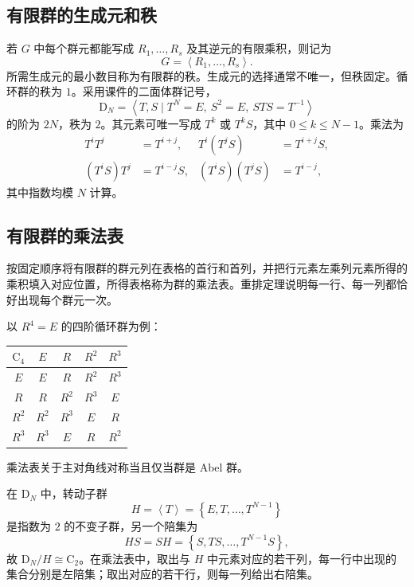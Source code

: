 \subsection{有限群的生成元和秩}
若 $G$ 中每个群元都能写成 $R_1,\ldots,R_s$ 及其逆元的有限乘积，则记为
\begin{equation}
G=\left\langle R_1,\ldots,R_s\right\rangle.
\end{equation}
所需生成元的最小数目称为有限群的秩。生成元的选择通常不唯一，但秩固定。循环群的秩为 $1$。采用课件的二面体群记号，
\begin{equation}
\mathrm{D}_N=\left\langle T,S\mid T^N=E,\ S^2=E,\ STS=T^{-1}\right\rangle
\end{equation}
的阶为 $2N$，秩为 $2$。其元素可唯一写成 $T^k$ 或 $T^kS$，其中 $0\leqslant k\leqslant N-1$。乘法为
\begin{align}
T^iT^j&=T^{i+j},&T^i\left(T^jS\right)&=T^{i+j}S,\\
\left(T^iS\right)T^j&=T^{i-j}S,&\left(T^iS\right)\left(T^jS\right)&=T^{i-j},
\end{align}
其中指数均模 $N$ 计算。

\subsection{有限群的乘法表}
按固定顺序将有限群的群元列在表格的首行和首列，并把行元素左乘列元素所得的乘积填入对应位置，所得表格称为群的乘法表。重排定理说明每一行、每一列都恰好出现每个群元一次。

以 $R^4=E$ 的四阶循环群为例：
\begin{center}
\begin{tabular}{c|cccc}
\toprule
$\mathrm{C}_4$ & $E$ & $R$ & $R^2$ & $R^3$\\ \midrule
$E$ & $E$ & $R$ & $R^2$ & $R^3$\\
$R$ & $R$ & $R^2$ & $R^3$ & $E$\\
$R^2$ & $R^2$ & $R^3$ & $E$ & $R$\\
$R^3$ & $R^3$ & $E$ & $R$ & $R^2$\\ \bottomrule
\end{tabular}
\end{center}
乘法表关于主对角线对称当且仅当群是 Abel 群。

在 $\mathrm{D}_N$ 中，转动子群
\begin{equation}
H=\left\langle T\right\rangle=\left\{E,T,\ldots,T^{N-1}\right\}
\end{equation}
是指数为 $2$ 的不变子群，另一个陪集为
\begin{equation}
HS=SH=\left\{S,TS,\ldots,T^{N-1}S\right\},
\end{equation}
故 $\mathrm{D}_N/H\cong\mathrm{C}_2$。在乘法表中，取出与 $H$ 中元素对应的若干列，每一行中出现的集合分别是左陪集；取出对应的若干行，则每一列给出右陪集。


